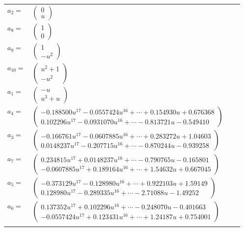 \documentclass[1p]{elsarticle_modified}
\theoremstyle{definition}
\begin{document}
\begin{tabular}{m{7pt} m{180pt} m{7pt} m{180pt} }
\flushright $a_{2}=$&$\begin{pmatrix}0\\u\end{pmatrix}$ \\
\flushright $a_{8}=$&$\begin{pmatrix}1\\0\end{pmatrix}$ \\
\flushright $a_{9}=$&$\begin{pmatrix}1\\- u^2\end{pmatrix}$ \\
\flushright $a_{10}=$&$\begin{pmatrix}u^2+1\\- u^2\end{pmatrix}$ \\
\flushright $a_{1}=$&$\begin{pmatrix}- u\\u^3+u\end{pmatrix}$ \\
\flushright $a_{4}=$&$\begin{pmatrix}-0.188500 u^{17}-0.0557424 u^{16}+\cdots+0.154930 u+0.676368\\0.102296 u^{17}-0.0931070 u^{16}+\cdots-0.813721 u-0.549410\end{pmatrix}$ \\
\flushright $a_{3}=$&$\begin{pmatrix}-0.166761 u^{17}-0.0607885 u^{16}+\cdots+0.283272 u+1.04603\\0.0148237 u^{17}-0.207715 u^{16}+\cdots-0.870244 u-0.939258\end{pmatrix}$ \\
\flushright $a_{7}=$&$\begin{pmatrix}0.234815 u^{17}+0.0148237 u^{16}+\cdots-0.790765 u-0.165801\\-0.0607885 u^{17}+0.189164 u^{16}+\cdots+1.54632 u+0.667045\end{pmatrix}$ \\
\flushright $a_{5}=$&$\begin{pmatrix}-0.373129 u^{17}-0.128980 u^{16}+\cdots+0.922103 u+1.59149\\0.128980 u^{17}-0.289335 u^{16}+\cdots-2.71088 u-1.49252\end{pmatrix}$ \\
\flushright $a_{6}=$&$\begin{pmatrix}0.137352 u^{17}+0.102296 u^{16}+\cdots-0.248070 u-0.401663\\-0.0557424 u^{17}+0.123431 u^{16}+\cdots+1.24187 u+0.754001\end{pmatrix}$\\&\end{tabular}
\end{document}
